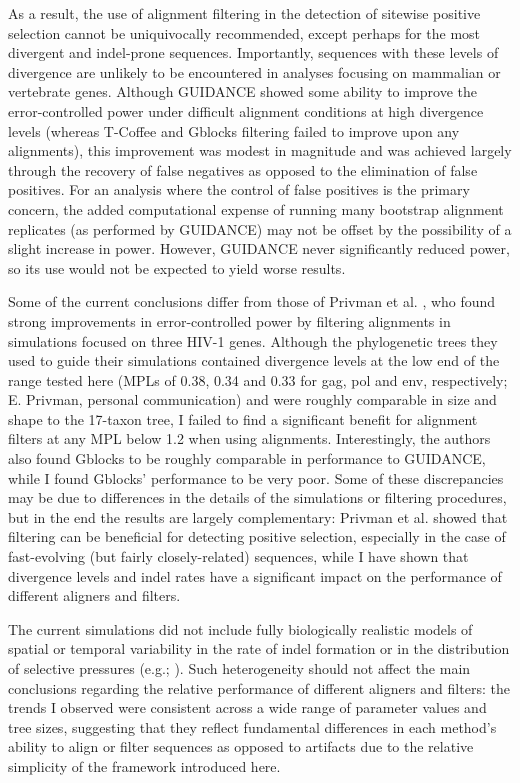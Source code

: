 As a result, the use of alignment filtering in the detection of
sitewise positive selection cannot be uniquivocally recommended,
except perhaps for the most divergent and indel-prone
sequences. Importantly, sequences with these levels of divergence are
unlikely to be encountered in analyses focusing on mammalian or
vertebrate genes. Although GUIDANCE showed some ability to improve the
error-controlled power under difficult alignment conditions at high
divergence levels (whereas T-Coffee and Gblocks filtering failed to
improve upon any \prankc alignments), this improvement was modest in
magnitude and was achieved largely through the recovery of false
negatives as opposed to the elimination of false positives. For an
analysis where the control of false positives is the primary concern,
the added computational expense of running many bootstrap alignment
replicates (as performed by GUIDANCE) may not be offset by the
possibility of a slight increase in power. However, GUIDANCE never
significantly reduced power, so its use would not be expected to yield
worse results.

Some of the current  conclusions differ from those of Privman et
al. \citeyearpar{Privman2011Improving}, who found strong improvements
in error-controlled power by filtering alignments in simulations
focused on three HIV-1 genes. Although the phylogenetic trees they
used to guide their simulations contained divergence levels at the low
end of the  range tested here (MPLs of 0.38, 0.34 and 0.33 for gag, pol and
env, respectively; E. Privman, personal communication) and were
roughly comparable in size and shape to the 17-taxon tree, I failed
to find a significant benefit for alignment filters at any MPL below
1.2 when using \prankc alignments. Interestingly, the authors also
found Gblocks to be roughly comparable in performance to GUIDANCE,
while I found Gblocks' performance to be very poor. Some of these
discrepancies may be due to differences in the details of the
simulations or filtering procedures, but in the end the results are
largely complementary: Privman et al. showed that filtering can be
beneficial for detecting positive selection, especially in the case of
fast-evolving (but fairly closely-related) sequences, while I have
shown that divergence levels and indel rates have a significant impact
on the performance of different aligners and filters.

The current simulations did not include fully biologically realistic
models of spatial or temporal variability in the rate of indel
formation or in the distribution of selective pressures (e.g.;
\citealt{Whelan2008}).  Such heterogeneity should not affect the main
conclusions regarding the relative performance of different aligners
and filters: the trends I observed were consistent across a wide range
of parameter values and tree sizes, suggesting that they reflect
fundamental differences in each method's ability to align or filter
sequences as opposed to artifacts due to the relative simplicity of
the framework introduced here.


